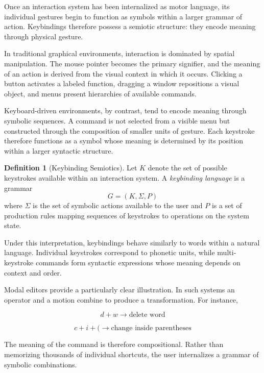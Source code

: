\documentclass[11pt]{article}
\theoremstyle{definition}
\newtheorem{definition}{Definition}[section]
\begin{document}
Once an interaction system has been internalized as motor language, its
individual gestures begin to function as symbols within a larger grammar
of action. Keybindings therefore possess a semiotic structure: they
encode meaning through physical gesture.

In traditional graphical environments, interaction is dominated by
spatial manipulation. The mouse pointer becomes the primary signifier,
and the meaning of an action is derived from the visual context in which
it occurs. Clicking a button activates a labeled function, dragging a
window repositions a visual object, and menus present hierarchies of
available commands.

Keyboard-driven environments, by contrast, tend to encode meaning
through symbolic sequences. A command is not selected from a visible
menu but constructed through the composition of smaller units of
gesture. Each keystroke therefore functions as a symbol whose meaning
is determined by its position within a larger syntactic structure.

\begin{definition}[Keybinding Semiotics]
Let $K$ denote the set of possible keystrokes available within an
interaction system. A \emph{keybinding language} is a grammar
\[
G = (K, \Sigma, P)
\]
where $\Sigma$ is the set of symbolic actions available to the user and
$P$ is a set of production rules mapping sequences of keystrokes to
operations on the system state.
\end{definition}

Under this interpretation, keybindings behave similarly to words within
a natural language. Individual keystrokes correspond to phonetic units,
while multi-keystroke commands form syntactic expressions whose meaning
depends on context and order.

Modal editors provide a particularly clear illustration. In such systems
an operator and a motion combine to produce a transformation. For
instance,

\[
d + w \rightarrow \text{delete word}
\]

\[
c + i + ( \rightarrow \text{change inside parentheses}
\]

The meaning of the command is therefore compositional. Rather than
memorizing thousands of individual shortcuts, the user internalizes a
grammar of symbolic combinations.
\end{document}
